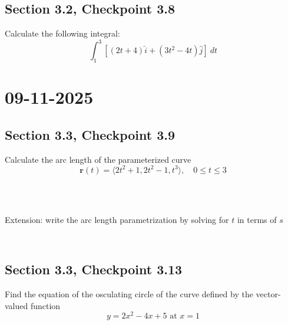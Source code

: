 \documentclass[]{mangos-musings}
\begin{document}
\subsection{Section 3.2, Checkpoint 3.8}
Calculate the following integral:
\[\int_{1}^{3}\left[(2t+4)\hat{i} + (3t^2 - 4t)\hat{j}\right] \ dt\]

\newpage
\section{09-11-2025}
\subsection{Section 3.3, Checkpoint 3.9}
Calculate the arc length of the parameterized curve
\[\mathbf{r}(t) = \langle 2t^2 + 1, 2t^2 - 1, t^3 \rangle, \quad 0 \le t \le 3\]
\begin{align*}
  \\ \\ \\ \\ \\ \\ \\ \\ \\ \\
\end{align*}
Extension: write the arc length parametrization by solving for $t$ in terms of $s$
\begin{align*}
  \\ \\ \\ \\
\end{align*}

\newpage
\subsection{Section 3.3, Checkpoint 3.13}
Find the equation of the osculating circle of the curve defined by the vector-valued function 
\[y = 2x^2 - 4x + 5 \text{ at } x = 1\]
\begin{align*}
  \\ \\ \\ \\ \\ \\ \\ \\ \\ \\
\end{align*}
\end{document}
